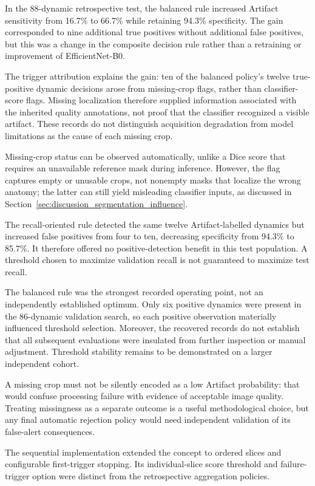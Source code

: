 In the 88-dynamic retrospective test, the balanced rule increased Artifact sensitivity from 16.7\% to 66.7\% while retaining 94.3\% specificity. The gain corresponded to nine additional true positives without additional false positives, but this was a change in the composite decision rule rather than a retraining or improvement of EfficientNet-B0.

The trigger attribution explains the gain: ten of the balanced policy's twelve true-positive dynamic decisions arose from missing-crop flags, rather than classifier-score flags. Missing localization therefore supplied information associated with the inherited quality annotations, not proof that the classifier recognized a visible artifact. These records do not distinguish acquisition degradation from model limitations as the cause of each missing crop.

Missing-crop status can be observed automatically, unlike a Dice score that requires an unavailable reference mask during inference. However, the flag captures empty or unusable crops, not nonempty masks that localize the wrong anatomy; the latter can still yield misleading classifier inputs, as discussed in Section~\ref{sec:discussion_segmentation_influence}.

The recall-oriented rule detected the same twelve Artifact-labelled dynamics but increased false positives from four to ten, decreasing specificity from 94.3\% to 85.7\%. It therefore offered no positive-detection benefit in this test population. A threshold chosen to maximize validation recall is not guaranteed to maximize test recall.

The balanced rule was the strongest recorded operating point, not an independently established optimum. Only six positive dynamics were present in the 86-dynamic validation search, so each positive observation materially influenced threshold selection. Moreover, the recovered records do not establish that all subsequent evaluations were insulated from further inspection or manual adjustment. Threshold stability remains to be demonstrated on a larger independent cohort.

A missing crop must not be silently encoded as a low Artifact probability: that would confuse processing failure with evidence of acceptable image quality. Treating missingness as a separate outcome is a useful methodological choice, but any final automatic rejection policy would need independent validation of its false-alert consequences.

The sequential implementation extended the concept to ordered slices and configurable first-trigger stopping. Its individual-slice score threshold and failure-trigger option were distinct from the retrospective aggregation policies.

